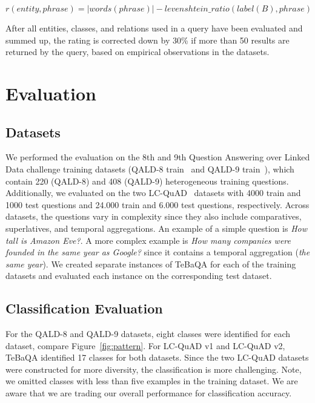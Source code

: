 \documentclass{IOS-Book-Article}
\begin{document}
\[r(entity, phrase) = |words(phrase)| - levenshtein\_ratio(label(B), phrase)\]

After all entities, classes, and relations used in a query have been evaluated and summed up, the rating is corrected down by 30\% if more than 50 results are returned by the query, based on empirical observations in the datasets.

\section{Evaluation}\label{chapter:evaluation}
\subsection{Datasets}

We performed the evaluation on the 8th and 9th Question Answering over Linked Data challenge training datasets (QALD-8 train~\cite{qald-8} and  QALD-9 train~\cite{qald-9}), which contain 220 (QALD-8) and 408 (QALD-9) heterogeneous training questions. Additionally, we evaluated on the two LC-QuAD~\cite{LC-QuADv1,lc-quadv2} datasets with 4000 train and 1000 test questions and 24.000 train and 6.000 test questions, respectively. Across datasets, the questions vary in complexity since they also include comparatives, superlatives, and temporal aggregations. An example of a simple question is \textit{How tall is Amazon Eve?}. A more complex example is \textit{How many companies were founded in the same year as Google?} since it contains a temporal aggregation (\textit{the same year}).
We created separate instances of TeBaQA for each of the training datasets and evaluated each instance on the corresponding test dataset.

\subsection{Classification Evaluation}
\label{sec:eval_classifier}

For the QALD-8 and QALD-9 datasets, eight classes were identified for each dataset, compare Figure~\ref{fig:pattern}.
For LC-QuAD v1 and LC-QuAD v2, TeBaQA identified 17 classes for both datasets. Since the two LC-QuAD datasets were constructed for more diversity, the classification is more challenging.
Note, we omitted classes with less than five examples in the training dataset. We are aware that we are trading our overall performance for classification accuracy. 
\end{document}

